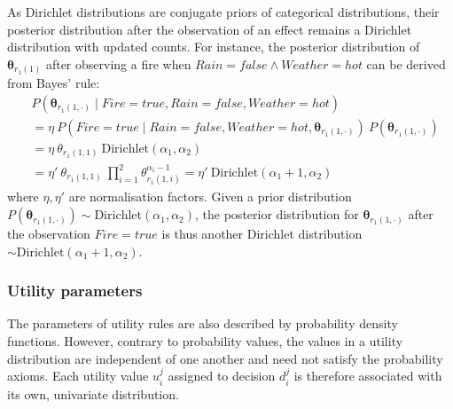 As Dirichlet distributions are conjugate priors of categorical distributions, their posterior distribution after the observation of an effect remains a Dirichlet distribution with updated counts. For instance, the posterior distribution of $\boldsymbol\theta_{r_{1}(1)}$ after observing a fire when $\mathit{Rain}\!=\!\mathit{false} \land \mathit{Weather}\!=\!\mathit{hot}$ can be derived from Bayes' rule: 
\begin{align}
&P(\boldsymbol\theta_{r_{1}(1, \cdot)} \; | \; \mathit{Fire}\!=\!\mathit{true}, \mathit{Rain}\!=\!\mathit{false}, \mathit{Weather}\!=\!\mathit{hot}) \nonumber \\
& = \eta \ P(\mathit{Fire}\!=\!\mathit{true} \; | \; \mathit{Rain}\!=\!\mathit{false}, \mathit{Weather}\!=\!\mathit{hot}, \boldsymbol\theta_{r_{1}(1, \cdot)}) \ P(\boldsymbol\theta_{r_{1}(1, \cdot)}) \nonumber \\
& = \eta \ \theta_{r_{1}(1,1)} \ \mathrm{Dirichlet}(\alpha_1,\alpha_2) \nonumber \\
& = \eta' \ \theta_{r_{1}(1,1)} \ \prod_{i=1}^2 \theta_{r_{1}(1,i)}^{\alpha_i - 1}   = \eta' \ \textrm{Dirichlet}(\alpha_1+1,\alpha_2) \nonumber
\end{align}
where $\eta, \eta'$ are normalisation factors.  Given a prior distribution $P(\boldsymbol\theta_{r_{1}(1, \cdot)}) \sim \mathrm{Dirichlet}(\alpha_1, \alpha_2)$, the posterior distribution for $\boldsymbol\theta_{r_{1}(1, \cdot)}$ after the observation  $\mathit{Fire}\!=\!\mathit{true}$ is thus another Dirichlet distribution $\sim \mathrm{Dirichlet}(\alpha_1+1,\alpha_2)$. 



\subsubsection*{Utility parameters}

The parameters of utility rules are also described by probability density functions.  However, contrary to probability values, the values in a utility distribution are independent of one another and need not satisfy the probability axioms. Each utility value $u_i^j$ assigned to decision $d_i^j$ is therefore associated with its own, univariate distribution.

